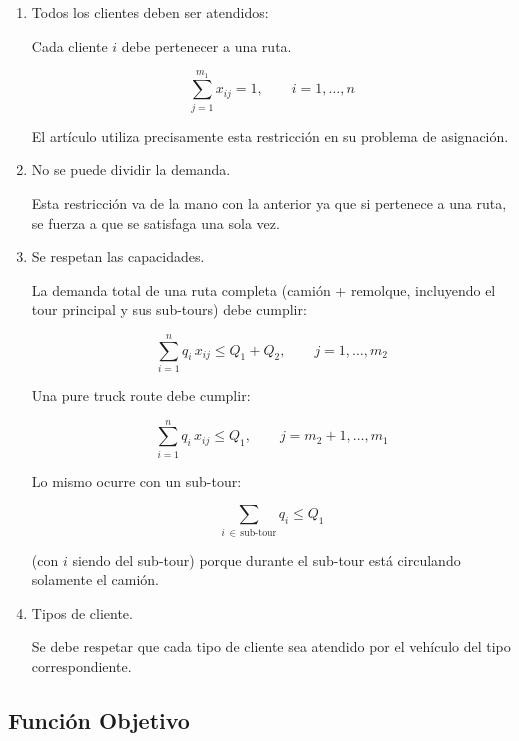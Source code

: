 \documentclass[letter, 10pt]{article}
\begin{document}
\begin{enumerate}
\item Todos los clientes deben ser atendidos:

Cada cliente $i$ debe pertenecer a una ruta.

\begin{equation}
\sum_{j=1}^{m_1} x_{ij} = 1, \qquad i=1,\dots,n
\end{equation}

El art\'iculo utiliza precisamente esta restricci\'on en su problema de asignaci\'on.

\item No se puede dividir la demanda.

Esta restricci\'on va de la mano con la anterior ya que si pertenece a una ruta, se fuerza a que se satisfaga una sola vez.

\item Se respetan las capacidades.

La demanda total de una ruta completa (cami\'on + remolque, incluyendo el tour principal y sus sub-tours) debe cumplir:

\begin{equation}
\sum_{i=1}^{n} q_i \, x_{ij} \le Q_1 + Q_2, \qquad j=1,\dots,m_2
\end{equation}

Una pure truck route debe cumplir:

\begin{equation}
\sum_{i=1}^{n} q_i \, x_{ij} \le Q_1, \qquad j=m_2+1,\dots,m_1
\end{equation}

Lo mismo ocurre con un sub-tour:

\begin{equation}
\sum_{i \,\in\, \text{sub-tour}} q_i \le Q_1
\end{equation}

(con $i$ siendo del sub-tour) porque durante el sub-tour est\'a circulando solamente el cami\'on.

\item Tipos de cliente.

Se debe respetar que cada tipo de cliente sea atendido por el veh\'iculo del tipo correspondiente.
\end{enumerate}

\subsection{Funci\'on Objetivo}
\end{document}
